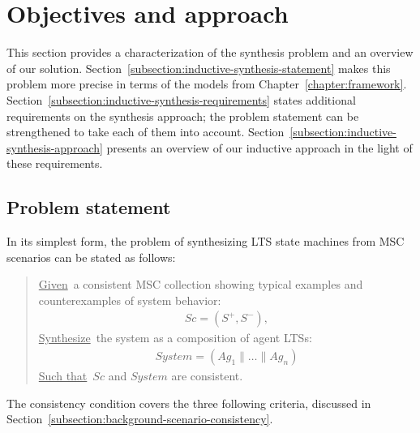 \section{Objectives and approach\label{section:inductive-objectives-and-approach}}

This section provides a characterization of the synthesis problem and an overview of our solution. Section~\ref{subsection:inductive-synthesis-statement} makes this problem more precise in terms of the models from Chapter~\ref{chapter:framework}. Section~\ref{subsection:inductive-synthesis-requirements} states additional requirements on the synthesis approach; the problem statement can be strengthened to take each of them into account. Section~\ref{subsection:inductive-synthesis-approach} presents an overview of our inductive approach in the light of these requirements.


\subsection{Problem statement\label{subsection:inductive-synthesis-statement}}

In its simplest form, the problem of synthesizing LTS state machines from MSC scenarios can be stated as follows:

\begin{quote}
\underline{Given}~a consistent MSC collection showing typical examples and counterexamples of system behavior:
\begin{align*}
Sc = (S^+,S^-),
\end{align*}
\underline{Synthesize}~the system as a composition of agent LTSs:
\begin{align*}
System = (Ag_1 \parallel \ldots \parallel Ag_n)
\end{align*}
\underline{Such that}~$Sc$ and $System$ are consistent.
\end{quote}

The consistency condition covers the three following criteria, discussed in Section~\ref{subsection:background-scenario-consistency}.

